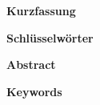 \cleardoublepage

\begin{minipage}[0.95\textheight]{0.95\textwidth}
    \large
    \textbf{Kurzfassung}\par
    \vspace{\baselineskip}
    \small
    

    
    \vspace{\baselineskip}
    \normalsize
    \textbf{Schlüsselwörter}\par
    \vspace{0.5\baselineskip}
    \small    
    
\end{minipage}

\newpage

\begin{minipage}[0.95\textheight]{0.95\textwidth}
    \large
    \textbf{Abstract}\par
    \vspace{\baselineskip}
    \small
    


    \vspace{\baselineskip}
    \normalsize
    \textbf{Keywords}\par
    \vspace{0.5\baselineskip}
    \small
    
\end{minipage}
